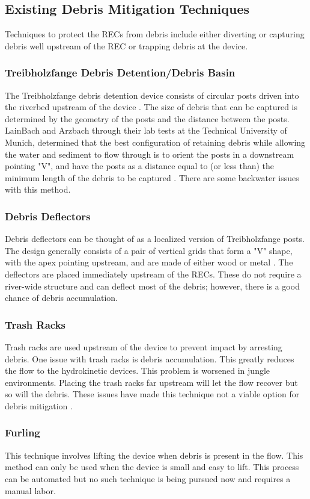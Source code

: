 \subsection{Existing Debris Mitigation Techniques}
Techniques to protect the RECs from debris include either diverting or capturing debris well upstream of the REC or trapping debris at the device.
\subsubsection{Treibholzfange Debris Detention/Debris Basin}
The Treibholzfange debris detention device consists of circular posts driven into the riverbed upstream of the device \cite{Reference1}. The size of debris that can be captured is determined by the geometry of the posts and the distance between the posts. LainBach and Arzbach through their lab tests at the Technical University of Munich, determined that the best configuration of retaining debris while allowing the water and sediment to flow through is to orient the posts in a downstream pointing "V", and have the posts as a distance equal to (or less than) the minimum length of the debris to be captured \cite{Reference4}. There are some backwater issues with this method. 
\subsubsection{Debris Deflectors}
Debris deflectors can be thought of as a localized version of Treibholzfange posts. The design generally consists of a pair of vertical grids that form a "V" shape, with the apex pointing upstream, and are made of either wood or metal \cite{Reference1}. The deflectors are placed immediately upstream of the RECs. These do not require a river-wide structure and can deflect most of the debris; however, there is a good chance of debris accumulation. 
\subsubsection{Trash Racks}
Trash racks are used upstream of the device to prevent impact by arresting debris. One issue with trash racks is debris accumulation. This greatly reduces the flow to the hydrokinetic devices. This problem is worsened in jungle environments. Placing the trash racks far upstream will let the flow recover but so will the debris. These issues have made this technique not a viable option for debris mitigation \cite{Reference1}. 
\subsubsection{Furling}
This technique involves lifting the device when debris is present in the flow. This method can only be used when the device is small and easy to lift. This process can be automated but no such technique is being pursued now and requires a manual labor.
